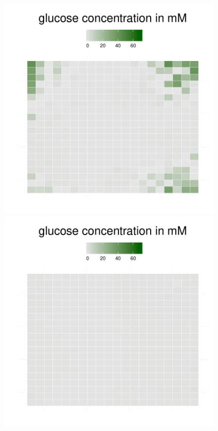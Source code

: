 \begin{figure}[h!]
{\begin{minipage}[t]{0.3\textwidth}
  \end{minipage}
  \begin{minipage}[t]{0.3\textwidth}
    \includegraphics[width=\textwidth]{../results/img/ecoli_20x20_aerob_seed55_glc40.pdf}
  \end{minipage}
  \begin{minipage}[t]{0.3\textwidth}
    \includegraphics[width=\textwidth]{../results/img/ecoli_20x20_aerob_seed55_glc50.pdf}

\end{minipage}}
\end{figure}
